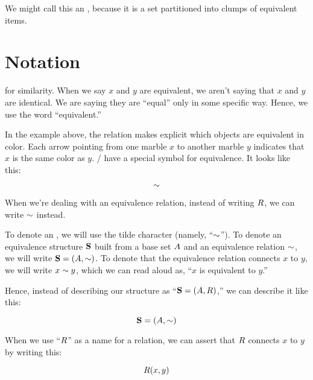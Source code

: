 \documentclass[../../../main.tex]{subfiles}
\begin{document}
We might call this an , because it is a set partitioned into clumps of equivalent items.


\section{Notation}

 for similarity. When we say $x$ and $y$ are equivalent, we aren't saying that $x$ and $y$ are identical. We are saying they are ``equal'' only in some specific way. Hence, we use the word ``equivalent.''

In the example above, the relation makes explicit which objects are equivalent in color. Each arrow pointing from one marble $x$ to another marble $y$ indicates that $x$ is the same color as $y$. \Mathers/ have a special symbol for equivalence. It looks like this:

\begin{equation*}
  \equivalence/
\end{equation*}

When we're dealing with an equivalence relation, instead of writing $R$, we can write $\equivalence/$ instead. 

\begin{aside}
  \begin{notation}
    To denote an , we will use the tilde character (namely, ``$\equivalence/$''). To denote an equivalence structure $\mathbf{S}$ built from a base set $A$ and an equivalence relation $\equivalence/$, we will write $\struct{S} = (\set{A}, \equivalence/)$. To denote that the equivalence relation connects $x$ to $y$, we will write $x \equivalence/ y$, which we can read aloud as, ``$x$ is equivalent to $y$.''
  \end{notation}
\end{aside}

Hence, instead of describing our structure as ``$\mathbf{S} = (A, R)$,'' we can describe it like this:

\begin{equation*}
  \struct{S} = (\set{A}, \equivalence/)
\end{equation*}

When we use ``$R$'' as a name for a relation, we can assert that $R$ connects $x$ to $y$ by writing this:

\begin{equation*}
  R(x, y)
\end{equation*}
\end{document}
